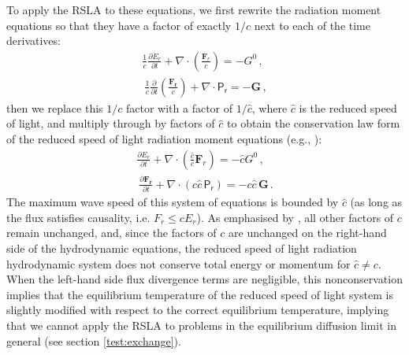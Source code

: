 \documentclass[fleqn,usenatbib]{mnras}
\newcommand{\vc}[1]{{\mathbf{#1}}}
\begin{document}
To apply the RSLA to these equations, we first rewrite the radiation moment equations so that they have a factor of exactly $1/c$ next to each of the time derivatives:
\begin{align}
    \frac{1}{c} \frac{\partial E_r}{\partial t} + \nabla \cdot \left( \frac{\vc{F}_r}{c} \right) = -G^0 \, , \\\
    \frac{1}{c} \frac{\partial}{\partial t} \left( \frac{\vc{F_r}}{c} \right) + \nabla \cdot \mathsf{P_r} = -\vc{G} \, ,
\end{align}
then we replace this $1/c$ factor with a factor of $1/\hat c$, where $\hat c$ is the reduced speed of light, and multiply through by factors of $\hat c$ to obtain the conservation law form of the reduced speed of light radiation moment equations (e.g., \citealt{Skinner_2013}):
\begin{align}
    \frac{\partial E_r}{\partial t} + \nabla \cdot \left( \frac{\hat c}{c} \vc{F}_r \right) = -\hat c G^0 \, , \\\
    \frac{\partial \vc{F_r}}{\partial t} + \nabla \cdot (c \hat c \, \mathsf{P_r}) = -c \hat c \, \vc{G} \, .
\end{align}
The maximum wave speed of this system of equations is bounded by $\hat c$ (as long as the flux satisfies causality, i.e. $F_r \leq cE_r$). As emphasised by \cite{Skinner_2013}, all other factors of $c$ remain unchanged, and, since the factors of $c$ are unchanged on the right-hand side of the hydrodynamic equations, the reduced speed of light radiation hydrodynamic system does not conserve total energy or momentum for $\hat{c} \neq c$. 
When the left-hand side flux divergence terms are negligible, this nonconservation implies that the equilibrium temperature of the reduced speed of light system is slightly modified with respect to the correct equilibrium temperature, implying that we cannot apply the RSLA to problems in the equilibrium diffusion limit in general (see section \ref{test:exchange}).
\end{document}

